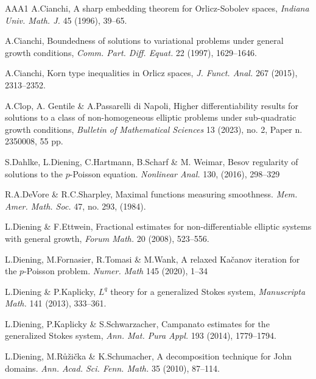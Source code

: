 \documentclass[leqno,11pt]{amsart}%
\numberwithin{equation}{section}
\theoremstyle{definition}
\numberwithin{equation}{section}
\begin{document}
\begin{thebibliography}{AAA1}
 A.Cianchi,
  \newblock  A sharp embedding theorem for Orlicz-Sobolev spaces,
  \newblock \textit{Indiana Univ. Math. J.} 45 (1996), 
  39--65.


 A.Cianchi,
  \newblock Boundedness of solutions to variational problems under general growth conditions,
  \newblock \textit{Comm. Part. Diff. Equat.} 22 (1997), 
  1629--1646.


 A.Cianchi,
  \newblock Korn type inequalities in Orlicz spaces,
  \newblock \textit{J. Funct. Anal.} 267 (2015), 
  2313--2352.

  
  A.Clop, A. Gentile \& A.Passarelli di Napoli,
  \newblock  Higher differentiability results
for solutions to a class of non-homogeneous elliptic problems under sub-quadratic growth
conditions,
  \newblock \textit{Bulletin of Mathematical Sciences} 
   13 (2023), 
no. 2, Paper n. 2350008, 55 pp.



 S.Dahlke, L.Diening, C.Hartmann, B.Scharf \& M. Weimar,   \newblock Besov regularity of solutions to the
$p$-Poisson equation. \newblock \textit{Nonlinear Anal.} 130,  (2016), 298--329


 R.A.DeVore \& R.C.Sharpley,
 \newblock Maximal functions measuring smoothness.
 \newblock \textit{Mem. Amer. Math. Soc.} 
 {47}, no. 293, (1984).


  L.Diening \& F.Ettwein,
  \newblock Fractional estimates for non-differentiable elliptic
  systems with general growth, 
  \newblock \textit{Forum Math.} 20  (2008), 523--556.


  L.Diening, M.Fornasier, R.Tomasi \& M.Wank,
  \newblock A relaxed Ka\v canov iteration for the $p$-Poisson problem.
  \newblock \textit{Numer. Math} 145 (2020),  1--34


  L.Diening \& P.Kaplicky, 
  \newblock $L^q$ theory for a generalized Stokes system,
  \newblock \textit{Manuscripta Math.} 141 
   (2013),  333--361.


  L.Diening, P.Kaplicky \& S.Schwarzacher,
  \newblock Campanato estimates for the generalized Stokes system,
  \newblock \textit{ Ann.
Mat. Pura Appl.} 193
   (2014),  1779--1794.



  L.Diening, M.R\r u\v zi\v cka \& K.Schumacher,
  \newblock A decomposition technique for John domains.
  \newblock \textit{Ann. Acad. Sci. Fenn. Math.} 35
  (2010), 87--114.


\end{thebibliography}
\end{document}
